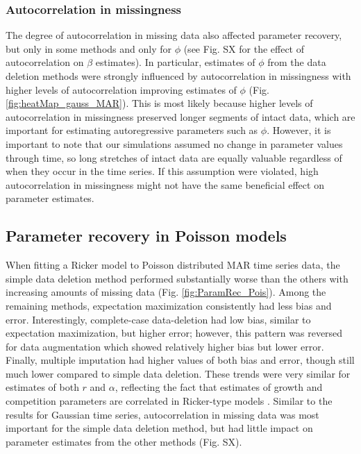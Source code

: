 \documentclass{article}
\begin{document}
\begin{linenumbers}
\subsubsection*{Autocorrelation in missingness}
The degree of autocorrelation in missing data also affected parameter recovery, but only in some methods and only for $\phi$ (see Fig. SX for the effect of autocorrelation on $\beta$ estimates). In particular, estimates of $\phi$ from the data deletion methods were strongly influenced by autocorrelation in missingness with higher levels of autocorrelation improving estimates of $\phi$ (Fig. \ref{fig:heatMap_gauss_MAR}). This is most likely because higher levels of autocorrelation in missingness preserved longer segments of intact data, which are important for estimating autoregressive parameters such as $\phi$. However, it is important to note that our simulations assumed no change in parameter values through time, so long stretches of intact data are equally valuable regardless of when they occur in the time series. If this assumption were violated, high autocorrelation in missingness might not have the same beneficial effect on parameter estimates.  

\subsection*{Parameter recovery in Poisson models}
When fitting a Ricker model to Poisson distributed MAR time series data, the simple data deletion method performed substantially worse than the others with increasing amounts of missing data (Fig. \ref{fig:ParamRec_Pois}). Among the remaining methods, expectation maximization consistently had less bias and error. Interestingly, complete-case data-deletion had low bias, similar to expectation maximization, but higher error; however, this pattern was reversed for data augmentation which showed relatively higher bias but lower error. Finally, multiple imputation had higher values of both bias and error, though still much lower compared to simple data deletion. These trends were very similar for estimates of both $r$ and $\alpha$, reflecting the fact that estimates of growth and competition parameters are correlated in Ricker-type models \citep{bender1984perturbation}. Similar to the results for Gaussian time series, autocorrelation in missing data was most important for the simple data deletion method, but had little impact on parameter estimates from the other methods (Fig. SX).


\end{linenumbers}
\end{document}
